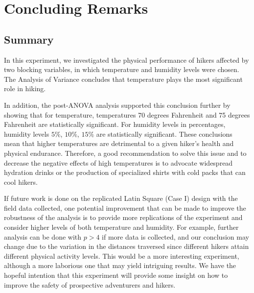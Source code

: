 

\chapter{Concluding Remarks}
\thispagestyle{empty}
\section{Summary}

In this experiment, we investigated the physical performance of hikers affected by two blocking variables, in which temperature and humidity levels were chosen. The Analysis of Variance concludes that temperature plays the most significant role in hiking. 

In addition, the post-ANOVA analysis supported this conclusion further by showing that for temperature, temperatures 70 degrees Fahrenheit and 75 degrees Fahrenheit are statistically significant. For humidity levels in percentages, humidity levels $5\%$, $10\%$, $15\%$ are statistically significant. These conclusions mean that higher temperatures are detrimental to a given hiker's health and physical endurance. Therefore, a good recommendation to solve this issue and to decrease the negative effects of high temperatures is to advocate widespread hydration drinks or the production of specialized shirts with cold packs that can cool hikers.

If future work is done on the replicated Latin Square (Case I) design with the field data collected, one potential improvement that can be made to improve the robustness of the analysis is to provide more replications of the experiment and consider higher levels of both temperature and humidity. For example, further analysis can be done with $p>4$ if more data is collected, and our conclusion may change due to the variation in the distances traversed since different hikers attain different physical activity levels. This would be a more interesting experiment, although a more laborious one that may yield intriguing results. We have the hopeful intention that this experiment will provide some insight on how to improve the safety of prospective adventurers and hikers.